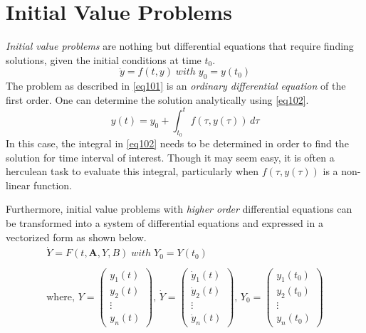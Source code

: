 \section{Initial Value Problems}\label{sec11}
\textit{Initial value problems} are nothing but differential equations that require finding solutions, given the initial conditions at time $t_0$.
\begin{equation}\label{eq101}
\dot{y} = f(t, y) \; with \; y_0 = y(t_0)
\end{equation}
The problem as described in \cref{eq101} is an \textit{ordinary differential equation} of the first order. One can determine the solution analytically using \cref{eq102}.
\begin{equation}\label{eq102}
y(t) = y_0 + \int_{t_0}^{t} f(\tau, y(\tau)) \, d\tau
\end{equation}
In this case, the integral in \cref{eq102} needs to be determined in order to find the solution for time interval of interest. Though it may seem easy, it is often a herculean task to evaluate this integral, particularly when $f(\tau, y(\tau))$ is a non-linear function. 

Furthermore, initial value problems with \textit{higher order} differential equations can be transformed into a system of differential equations and expressed in a vectorized form as shown below.
\begin{equation}\label{eq103}
\begin{gathered}
\dot{\mathit{Y}} = F (t,\mathbf{A}, \mathit{Y}, B) \; with \; \mathit{Y_0} = \mathit{Y}(t_0) \\
\\
\text{where, } 
\mathit{Y} = \begin{pmatrix}
           y_{1}(t) \\
           y_{2}(t) \\
           \vdots \\
           y_{n}(t)
         \end{pmatrix}
\text{, } 
\mathit{\dot{Y}} = \begin{pmatrix}
           \dot{y}_{1}(t) \\
           \dot{y}_{2}(t) \\
           \vdots \\
           \dot{y}_{n}(t)
         \end{pmatrix}
\text{, }
\mathit{Y_0} = \begin{pmatrix}
           y_{1}(t_0) \\
           y_{2}(t_0) \\
           \vdots \\
           y_{n}(t_0)
         \end{pmatrix}
\end{gathered}
\end{equation}


